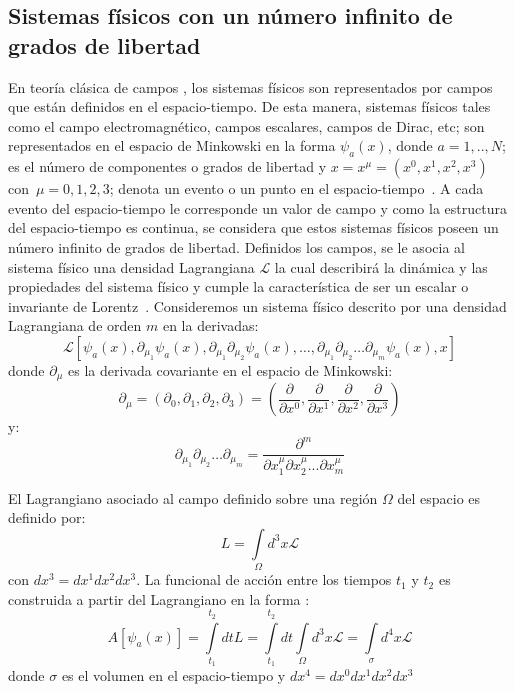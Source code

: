 \documentclass[a4paper,12pt]{article}
\begin{document}
\subsection{Sistemas físicos con un número infinito de grados de libertad}
En teoría clásica de campos \cite{noether}, los sistemas físicos son representados por campos que están definidos en el espacio-tiempo. De esta manera, sistemas físicos tales como el campo electromagnético, campos escalares, campos de Dirac, etc; son \mbox{representados} en el espacio de Minkowski en la forma $\psi_a(x)$, donde  $a=1,..,N$; es el número de componentes o grados de libertad y \mbox{$x=x^\mu=(x^0,x^1,x^2,x^3)$ } \mbox{con $\mu=0,1,2,3$;} \mbox{denota} un evento o un punto en el \mbox{espacio-tiempo \cite{greiner}.} A cada evento del \mbox{espacio-tiempo} le corresponde un valor de campo y como la estructura del espacio-tiempo es continua, se considera que estos sistemas físicos poseen un número infinito de grados de libertad. Definidos los campos, se le asocia al sistema físico una densidad Lagrangiana $\mathscr{L}$ la cual describirá la dinámica y las propiedades del sistema físico y cumple la característica de ser un escalar o invariante de \mbox{Lorentz \cite{greiner}.} Consideremos un sistema físico descrito por una densidad Lagrangiana de orden $m$ en la derivadas:
\begin{equation}
\mathscr{L}[\psi_a(x),\partial_{\mu_1}\psi_a(x),\partial_{\mu_1}\partial_{\mu_2}\psi_a(x),\dotso,\partial_{\mu_1}\partial_{\mu_2}\dotso\partial_{\mu_m}\psi_a(x),x]
\label{lanorm}
\end{equation}
donde $\partial_{\mu}$ es la derivada covariante en el espacio de Minkowski:
\begin{equation}
\partial_{\mu}=(\partial_0,\partial_1,\partial_2,\partial_3)=\left(\frac{\partial}{\partial x^0},\frac{\partial}{\partial x^1},\frac{\partial}{\partial x^2},\frac{\partial}{\partial x^3} \right) 
\end{equation}
y:
\begin{equation}
\partial_{\mu_1}\partial_{\mu_2}\dotso\partial_{\mu_m}=\frac{\partial^m}{\partial x_1^\mu\partial x_2^\mu...\partial x_m^\mu} 
\end{equation}

El Lagrangiano asociado al campo definido sobre una región $\Omega$ del espacio es definido por:
\begin{equation}
L=\int\limits_{\Omega}d^3 x \mathscr{L}
\end{equation}
con $dx^3=dx^1dx^2dx^3$. La funcional de acción entre los tiempos $t_1$ y $t_2$ es construida a partir del Lagrangiano en la forma \cite{noether, greiner}:
\begin{equation}
A[\psi_a(x)]=\int\limits_{t_1}^{t_2}dtL=\int\limits_{t_1}^{t_2}dt\int\limits_{\Omega}d^3 x \mathscr{L}=\int\limits_{\sigma}d^4x \mathscr{L}
\label{acmos}
\end{equation}
donde $\sigma$ es el volumen en el espacio-tiempo y \mbox{$dx^4=dx^0dx^1dx^2dx^3$}
\\
\end{document}
